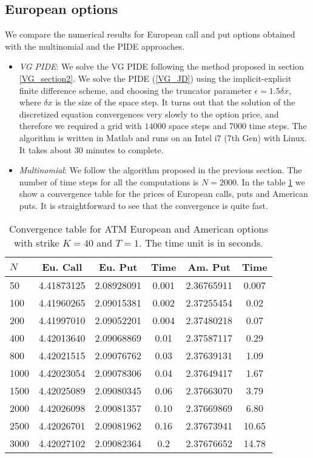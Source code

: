 \subsection{European options}


We compare the numerical results for European call and put options obtained with the multinomial and the PIDE approaches.
\begin{itemize}
 \item \emph{VG PIDE}: We solve the VG PIDE following the method proposed in section \ref{VG_section2}.
 We solve the PIDE (\ref{VG_JD}) using the implicit-explicit finite difference scheme, and choosing the truncator parameter $\epsilon = 1.5 \delta x$, 
 where $\delta x$ is the size of 
 the space step. It turns out that the solution of the discretized equation convergences very slowly to the option price, and therefore we required a grid with $14000$ space steps 
 and $7000$ time steps. The algorithm is written in Matlab and runs
 on an Intel i7 (7th Gen) with Linux. It takes about 30 minutes to complete. 
 \item \emph{Multinomial}: We follow the algorithm proposed in the previous section. The number of time steps for all the computations is $N=2000$. In the table \ref{Convergence} 
 we show a convergence table for the prices of European calls, puts and American puts. It is straightforward to see that the convergence is quite fast.  
\end{itemize}
\begin{table}[]
{\begin{tabular}{||l|c|c|c|c|c||}
\hline
  $N$ & Eu. Call & Eu. Put & Time & Am. Put & Time \\
\hline
    50 & 4.41873125 & 2.08928091 & 0.001 & 2.36765911 & 0.007 \\
    100 & 4.41960265 & 2.09015381 & 0.002 & 2.37255454 & 0.02 \\
    200 & 4.41997010 & 2.09052201 & 0.004 & 2.37480218 & 0.07 \\
    400 & 4.42013640 & 2.09068869 & 0.01 & 2.37587117 & 0.29 \\
    800 & 4.42021515 & 2.09076762 & 0.03 & 2.37639131 & 1.09 \\
    1000 & 4.42023054 & 2.09078306 & 0.04 & 2.37649417 & 1.67 \\
    1500 & 4.42025089 & 2.09080345 & 0.06 & 2.37663070 & 3.79 \\
    2000 & 4.42026098 & 2.09081357 & 0.10 & 2.37669869 & 6.80 \\
    2500 & 4.42026701 & 2.09081962 & 0.16 & 2.37673941 & 10.65 \\
    3000 & 4.42027102 & 2.09082364 & 0.2 & 2.37676652 & 14.78 \\
  \hline
\end{tabular}}
\caption{Convergence table for ATM European and American options with strike $K=40$ and $T=1$. The time unit is in seconds.}
\label{Convergence}
\end{table}
